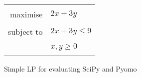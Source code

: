\renewcommand{\arraystretch}{0.7}
\begin{figure}[H]
    \centering
    \begin{minipage}{0.32\textwidth}
        \begin{tabularx}{\linewidth}{|rl|}
            \hline
            \multicolumn{2}{|X|}{} \tabularnewline
            maximise & $2x + 3y$\tabularnewline
            \hphantom{.......................}&\tabularnewline
            subject to & $2x + 3y \leq 9$\tabularnewline
            &\tabularnewline
            & $x,y \geq 0$\tabularnewline
            &\tabularnewline
            \hline
        \end{tabularx}%
    \end{minipage}
    \caption{Simple LP for evaluating SciPy and Pyomo}
    \label{fig:simple_lp}
\end{figure}
\renewcommand{\arraystretch}{1.0}
